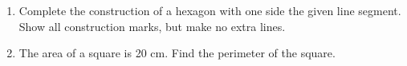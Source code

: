\documentclass[12pt, twoside]{article}
\begin{document}
\begin{enumerate}
\newpage

  \item Complete the construction of a hexagon with one side the given line segment. Show all construction marks, but make no extra lines. \vspace{9cm}
  \begin{center}
  \end{center} \vspace{4cm}

  \item The area of a square is 20 cm. Find the perimeter of the square.

  \end{enumerate}
\end{document}
